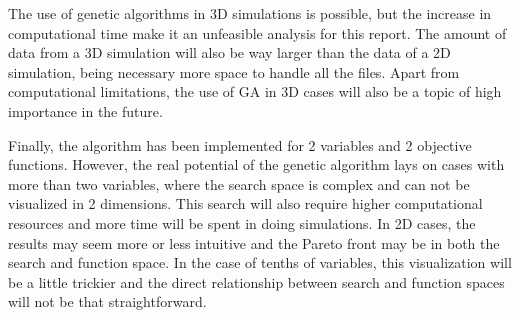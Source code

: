The use of genetic algorithms in 3D simulations is possible, but the increase in computational time make it an unfeasible analysis for this report. The amount of data from a 3D simulation will also be way larger than the data of a 2D simulation, being necessary more space to handle all the files. Apart from computational limitations, the use of GA in 3D cases will also be a topic of high importance in the future.

Finally, the algorithm has been implemented for 2 variables and 2 objective functions. However, the real potential of the genetic algorithm lays on cases with more than two variables, where the search space is complex and can not be visualized in 2 dimensions. This search will also require higher computational resources and more time will be spent in doing simulations. In 2D cases, the results may seem more or less intuitive and the Pareto front may be  in both the search and function space. In the case of tenths of variables, this visualization will be a little trickier and the direct relationship between search and function spaces will not be that straightforward. 